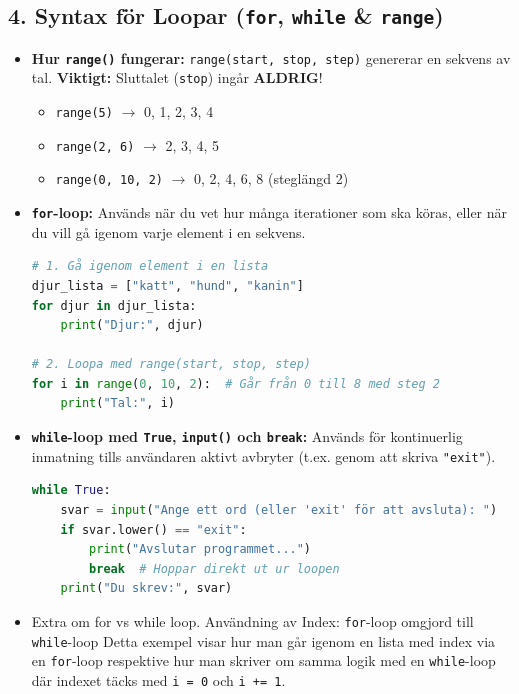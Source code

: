 \documentclass{article}
\begin{document}
\subsection*{4. Syntax för Loopar (\texttt{for}, \texttt{while} \& \texttt{range})}
\begin{itemize}
    \item \textbf{Hur \texttt{range()} fungerar:} \texttt{range(start, stop, step)} genererar en sekvens av tal. \textbf{Viktigt:} Sluttalet (\texttt{stop}) ingår \textbf{ALDRIG}!
    \begin{itemize}
        \item \texttt{range(5)} $\rightarrow$ 0, 1, 2, 3, 4
        \item \texttt{range(2, 6)} $\rightarrow$ 2, 3, 4, 5
        \item \texttt{range(0, 10, 2)} $\rightarrow$ 0, 2, 4, 6, 8 (steglängd 2)
    \end{itemize}

    \item \textbf{\texttt{for}-loop:} Används när du vet hur många iterationer som ska köras, eller när du vill gå igenom varje element i en sekvens.
\begin{lstlisting}[language=Python]
# 1. Gå igenom element i en lista
djur_lista = ["katt", "hund", "kanin"]
for djur in djur_lista:
    print("Djur:", djur)

# 2. Loopa med range(start, stop, step)
for i in range(0, 10, 2):  # Går från 0 till 8 med steg 2
    print("Tal:", i)
\end{lstlisting}

    \item \textbf{\texttt{while}-loop med \texttt{True}, \texttt{input()} och \texttt{break}:} Används för kontinuerlig inmatning tills användaren aktivt avbryter (t.ex. genom att skriva \texttt{"exit"}).
\begin{lstlisting}[language=Python]
while True:
    svar = input("Ange ett ord (eller 'exit' för att avsluta): ")
    if svar.lower() == "exit":
        print("Avslutar programmet...")
        break  # Hoppar direkt ut ur loopen
    print("Du skrev:", svar)
\end{lstlisting}

    \item Extra om for vs while loop. Användning av Index: \texttt{for}-loop omgjord till \texttt{while}-loop
    Detta exempel visar hur man går igenom en lista med index via en \texttt{for}-loop respektive hur man skriver om samma logik med en \texttt{while}-loop där indexet täcks med \texttt{i = 0} och \texttt{i += 1}.


\end{itemize}
\end{document}
